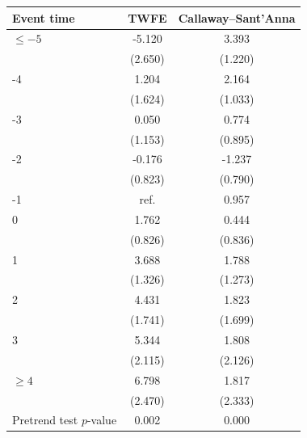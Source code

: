 \begin{tabular}{lcc}
\toprule
Event time & TWFE & Callaway--Sant'Anna \\
\midrule
\(\le -5\) & -5.120 &  3.393 \\
 & (2.650) & (1.220) \\
-4 &  1.204 &  2.164 \\
 & (1.624) & (1.033) \\
-3 &  0.050 &  0.774 \\
 & (1.153) & (0.895) \\
-2 & -0.176 & -1.237 \\
 & (0.823) & (0.790) \\
-1 & \multicolumn{1}{c}{ref.} &  0.957 \\
0 &  1.762 &  0.444 \\
 & (0.826) & (0.836) \\
1 &  3.688 &  1.788 \\
 & (1.326) & (1.273) \\
2 &  4.431 &  1.823 \\
 & (1.741) & (1.699) \\
3 &  5.344 &  1.808 \\
 & (2.115) & (2.126) \\
\(\ge 4\) &  6.798 &  1.817 \\
 & (2.470) & (2.333) \\
\midrule
Pretrend test \(p\)-value & 0.002 & 0.000 \\
\bottomrule
\end{tabular}
